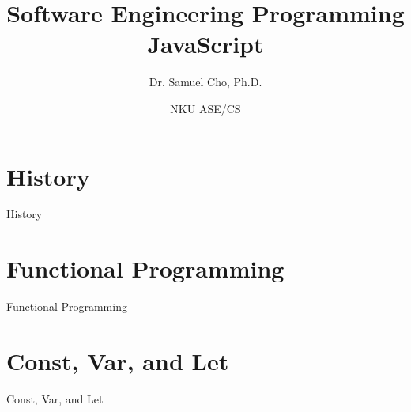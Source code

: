\documentclass[handout, 14pt]{beamer}
\begin{document}
\title[SE Tools 1]{Software Engineering Programming\\JavaScript}
\author{Dr. Samuel Cho, Ph.D.} 
\date{NKU ASE/CS} 

\frame{\titlepage} 

\begin{frame}[fragile]{}
\begin{center} 
    \tableofcontents
\end{center}
\end{frame}

\def\title{History}
\section{\title}
\begin{frame}[fragile]{}%
\begin{center}%
%
%
\title
\end{center}%
\end{frame}
 

\def\title{Functional Programming}
\section{\title}
\begin{frame}[fragile]{}%
\begin{center}%
%
%
\title
\end{center}%
\end{frame}
 

\def\title{Const, Var, and Let}
\section{\title}
\begin{frame}[fragile]{}%
\begin{center}%
%
%
\title
\end{center}%
\end{frame}
  
\end{document}
